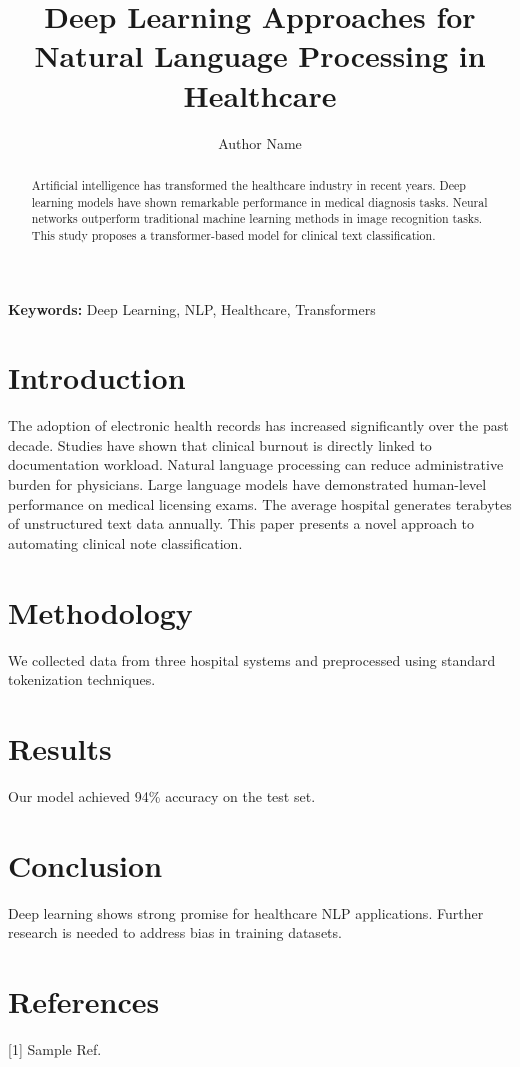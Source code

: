 \documentclass{article}
\title{Deep Learning Approaches for Natural Language Processing in Healthcare}
\author{Author Name}
\date{}
\begin{document}
\maketitle

\begin{abstract}
Artificial intelligence has transformed the healthcare industry in recent years. Deep learning models have shown remarkable performance in medical diagnosis tasks. Neural networks outperform traditional machine learning methods in image recognition tasks. This study proposes a transformer-based model for clinical text classification.
\end{abstract}

\textbf{Keywords:} Deep Learning, NLP, Healthcare, Transformers

\section{Introduction}
The adoption of electronic health records has increased significantly over the past decade. Studies have shown that clinical burnout is directly linked to documentation workload. Natural language processing can reduce administrative burden for physicians. Large language models have demonstrated human-level performance on medical licensing exams. The average hospital generates terabytes of unstructured text data annually. This paper presents a novel approach to automating clinical note classification.

\section{Methodology}
We collected data from three hospital systems and preprocessed using standard tokenization techniques.

\section{Results}
Our model achieved 94\% accuracy on the test set.

\section{Conclusion}
Deep learning shows strong promise for healthcare NLP applications. Further research is needed to address bias in training datasets.

\section*{References}
[1] Sample Ref.
\end{document}
